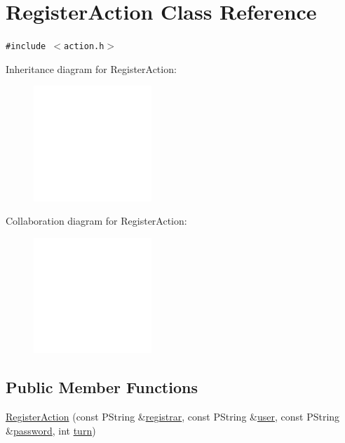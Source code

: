 \hypertarget{classRegisterAction}{
\section{RegisterAction Class Reference}
\label{classRegisterAction}
}
{\tt \#include $<$action.h$>$}

Inheritance diagram for RegisterAction:\nopagebreak
\begin{figure}[H]
\begin{center}
\leavevmode
\includegraphics[width=126pt]{classRegisterAction__inherit__graph}
\end{center}
\end{figure}
Collaboration diagram for RegisterAction:\nopagebreak
\begin{figure}[H]
\begin{center}
\leavevmode
\includegraphics[width=126pt]{classRegisterAction__coll__graph}
\end{center}
\end{figure}
\subsection*{Public Member Functions}
\begin{CompactItemize}
\item 
\hyperlink{classRegisterAction_955eec21894f1c59ad8e9692430476f9}{RegisterAction} (const PString \&\hyperlink{classRegisterAction_ac35a1ac2065a7114718b44d205ee8bd}{registrar}, const PString \&\hyperlink{classRegisterAction_aa4a6618f15066d50aec6d2a4b07d20f}{user}, const PString \&\hyperlink{classRegisterAction_55bb90773d5147d594f8601706a1bcc7}{password}, int \hyperlink{classAction_51e5d56a6aa4a037e90df19587a225c7}{turn})
\end{CompactItemize}
